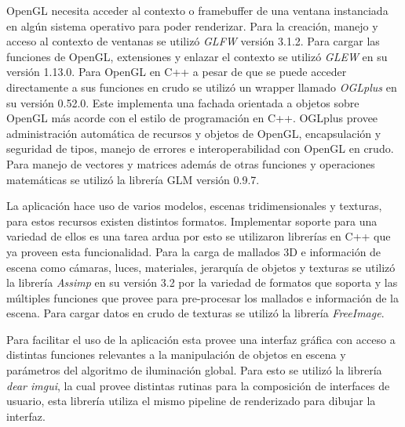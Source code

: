 OpenGL necesita acceder al contexto o framebuffer de una ventana instanciada en algún sistema operativo para poder renderizar. Para la creación, manejo y acceso al contexto de ventanas se utilizó \emph{GLFW} versión 3.1.2. Para cargar las funciones de OpenGL, extensiones y enlazar el contexto se utilizó \emph{GLEW} en su versión 1.13.0. Para OpenGL en C++ a pesar de que se puede acceder directamente a sus funciones en crudo se utilizó un wrapper llamado \emph{OGLplus} en su versión 0.52.0. Este implementa una fachada orientada a objetos sobre OpenGL más acorde con el estilo de programación en C++. OGLplus provee administración automática de recursos y objetos de OpenGL, encapsulación y seguridad de tipos, manejo de errores e interoperabilidad con OpenGL en crudo. Para manejo de vectores y matrices además de otras funciones y operaciones matemáticas se utilizó la librería GLM versión 0.9.7.

La aplicación hace uso de varios modelos, escenas tridimensionales y texturas, para estos recursos existen distintos formatos. Implementar soporte para una variedad de ellos es una tarea ardua por esto se utilizaron librerías en C++ que ya proveen esta funcionalidad. Para la carga de mallados 3D e información de escena como cámaras, luces, materiales, jerarquía de objetos y texturas se utilizó la librería \emph{Assimp} en su versión 3.2 por la variedad de formatos que soporta y las múltiples funciones que provee para pre-procesar los mallados e información de la escena. Para cargar datos en crudo de texturas se utilizó la librería \emph{FreeImage}.

Para facilitar el uso de la aplicación esta provee una interfaz gráfica con acceso a distintas funciones relevantes a la manipulación de objetos en escena y parámetros del algoritmo de iluminación global. Para esto se utilizó la librería \emph{dear imgui}, la cual provee distintas rutinas para la composición de interfaces de usuario, esta librería utiliza el mismo pipeline de renderizado para dibujar la interfaz.
